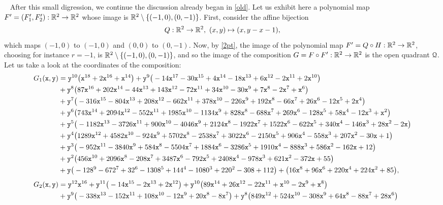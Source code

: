 \documentclass[11pt,a4paper]{amsart}
\theoremstyle{definition}
\theoremstyle{remark}
\newenvironment{stepsb}{%
\refstepcounter{theor}\noindent{\bf (\thetheor)\ }\ }%
{\em}
\newcommand{\Qq}{{\EuScript Q}}
\newcommand{\x}{{\tt x}} \newcommand{\y}{{\tt y}}
\begin{document}
\begin{stepsb}
After this small digression, we continue the discussion already began in \ref{old}. Let us exhibit here a polynomial map $F'=(F_1',F_2'):{\mathbb R}^2\to{\mathbb R}^2$ whose image is ${\mathbb R}^2\setminus\{(-1,0),(0,-1)\}$. First, consider the affine bijection
$$
Q:{\mathbb R}^2\to{\mathbb R}^2,\ (x,y)\mapsto(x,y-x-1),
$$
which maps $(-1,0)$ to $(-1,0)$ and $(0,0)$ to $(0,-1)$. Now, by \ref{2pt}, the image of the polynomial map $F'=Q\circ H:{\mathbb R}^2\to{\mathbb R}^2$, choosing for instance $r=-1$, is ${\mathbb R}^2\setminus\{(-1,0),(0,-1)\}$, and so the image of the composition $G=F\circ F':{\mathbb R}^2\to{\mathbb R}^2$ is the open quadrant $\Qq$. Let us take a look at the coordinates of the composition:
{\tiny\begin{align*}
G_1(\x,\y)&=\y^{10}\big(\x^{18}+2\x^{16}+\x^{14}\big)+\y^{9}\big(-14\x^{17}-30\x^{15}+4\x^{14}-18\x^{13}+6\x^{12}-2\x^{11}+2\x^{10}\big)\\
&+\y^{8}\big(87\x^{16}+202\x^{14}-44\x^{13}+143\x^{12}-72\x^{11}+34\x^{10}-30\x^{9}+7\x^{8}-2\x^{7}+\x^{6}\big)\\
&+\y^{7}\big(-316\x^{15}-804\x^{13}+208\x^{12}-662\x^{11}+378\x^{10}-226\x^{9}+192\x^{8}-66\x^{7}+26\x^{6}-12\x^{5}+2\x^{4}\big)\\
&+\y^{6}\big(743\x^{14}+2094\x^{12}-552\x^{11}+1985\x^{10}-1134\x^{9}+828\x^{8}-688\x^{7}+269\x^{6}-128\x^{5}+58\x^{4}-12\x^{3}+\x^{2}\big)\\
&+\y^{5}\big(-1182\x^{13}-3726\x^{11}+900\x^{10}-4046\x^{9}+2124\x^{8}-1922\x^{7}+1522\x^{6}-622\x^{5}+340\x^{4}-146\x^{3}+28\x^{2}-2\x\big)\\
&+\y^{4}\big(1289\x^{12}+4582\x^{10}-924\x^{9}+5702\x^{8}-2538\x^{7}+3022\x^{6}-2150\x^{5}+906\x^{4}-558\x^{3}+207\x^{2}-30\x+1\big)\\
&+\y^{3}\big(-952\x^{11}-3840\x^{9}+584\x^{8}-5504\x^{7}+1884\x^{6}-3286\x^{5}+1910\x^{4}-888\x^{3}+586\x^{2}-162\x+12\big)\\
&+\y^{2}\big(456\x^{10}+2096\x^{8}-208\x^{7}+3487\x^{6}-792\x^{5}+2408\x^{4}-978\x^{3}+621\x^{2}-372\x+55\big)\\
&+\y\big(-128^{9}-672^{7}+32^{6}-1308^{5}+144^{4}-1080^{3}+220^{2}-308+112\big)+\big(16\x^{8}+96\x^{6}+220\x^{4}+224\x^{2}+85\big),
\\[4pt]
G_2(\x,\y)&=\y^{12}\x^{16}+\y^{11}\big(-14\x^{15}-2\x^{13}+2\x^{12}\big)+\y^{10}\big(89\x^{14}+26\x^{12}-22\x^{11}+\x^{10}-2\x^{9}+\x^{8}\big)\\
&+\y^{9}\big(-338\x^{13}-152\x^{11}+108\x^{10}-12\x^{9}+20\x^{8}-8\x^{7}\big)+\y^{8}\big(849\x^{12}+524\x^{10}-308\x^{9}+64\x^{8}-88\x^{7}+28\x^{6}\big)\\

\end{align*}}
\end{stepsb}
\end{document}
